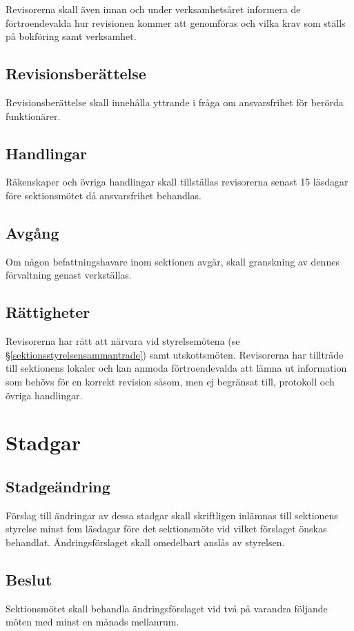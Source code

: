 \documentclass{datateknologsektionen-document}
\begin{document}
Revisorerna skall även innan och under verksamhetsåret informera de förtroendevalda hur revisionen
kommer att genomföras och vilka krav som ställs på bokföring samt verksamhet.

\subsection{Revisionsberättelse}
Revisionsberättelse skall innehålla yttrande i fråga om ansvarsfrihet för berörda
funktionärer.

\subsection{Handlingar}
Räkenskaper och övriga handlingar skall tillställas revisorerna senast 15 läsdagar före
sektionsmötet då ansvarsfrihet behandlas.

\subsection{Avgång}
Om någon befattningshavare inom sektionen avgår, skall granskning av dennes
förvaltning genast verkställas.

\subsection{Rättigheter}
Revisorerna har rätt att närvara vid styrelsemötena (se \S \ref{sektionsstyrelsensammantrade})
samt utskottsmöten. Revisorerna har tillträde till sektionens lokaler och kan anmoda
förtroendevalda att lämna ut information som behövs för en korrekt revision såsom,
men ej begränsat till, protokoll och övriga handlingar.

\section{Stadgar}
\subsection{Stadgeändring}
Förslag till ändringar av dessa stadgar skall skriftligen inlämnas till sektionens styrelse
minst fem läsdagar före det sektionsmöte vid vilket förslaget önskas behandlat.
Ändringsförslaget skall omedelbart anslås av styrelsen.

\subsection{Beslut}
Sektionsmötet skall behandla ändringsförslaget vid två på varandra följande möten med
minst en månads mellanrum.
\end{document}
